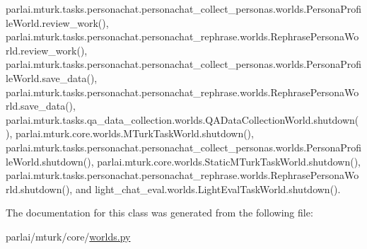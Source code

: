 parlai.\+mturk.\+tasks.\+personachat.\+personachat\+\_\+collect\+\_\+personas.\+worlds.\+Persona\+Profile\+World.\+review\+\_\+work(), parlai.\+mturk.\+tasks.\+personachat.\+personachat\+\_\+rephrase.\+worlds.\+Rephrase\+Persona\+World.\+review\+\_\+work(), parlai.\+mturk.\+tasks.\+personachat.\+personachat\+\_\+collect\+\_\+personas.\+worlds.\+Persona\+Profile\+World.\+save\+\_\+data(), parlai.\+mturk.\+tasks.\+personachat.\+personachat\+\_\+rephrase.\+worlds.\+Rephrase\+Persona\+World.\+save\+\_\+data(), parlai.\+mturk.\+tasks.\+qa\+\_\+data\+\_\+collection.\+worlds.\+Q\+A\+Data\+Collection\+World.\+shutdown(), parlai.\+mturk.\+core.\+worlds.\+M\+Turk\+Task\+World.\+shutdown(), parlai.\+mturk.\+tasks.\+personachat.\+personachat\+\_\+collect\+\_\+personas.\+worlds.\+Persona\+Profile\+World.\+shutdown(), parlai.\+mturk.\+core.\+worlds.\+Static\+M\+Turk\+Task\+World.\+shutdown(), parlai.\+mturk.\+tasks.\+personachat.\+personachat\+\_\+rephrase.\+worlds.\+Rephrase\+Persona\+World.\+shutdown(), and light\+\_\+chat\+\_\+eval.\+worlds.\+Light\+Eval\+Task\+World.\+shutdown().



The documentation for this class was generated from the following file\+:\begin{DoxyCompactItemize}
\item 
parlai/mturk/core/\hyperlink{parlai_2mturk_2core_2worlds_8py}{worlds.\+py}\end{DoxyCompactItemize}
